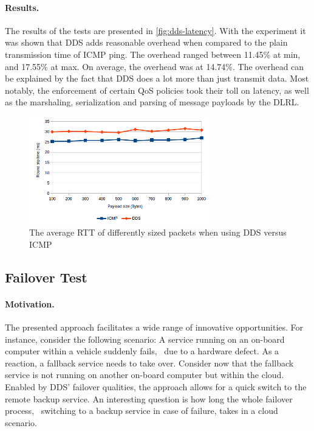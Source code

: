 \paragraph{Results.} 
The results of the tests are presented in \autoref{fig:dds-latency}. With the experiment it was shown that DDS adds reasonable overhead when compared to the plain transmission time of ICMP ping. The overhead ranged between 11.45\% at min, and 17.55\% at max. On average, the overhead was at 14.74\%. The overhead can be explained by the fact that DDS does a lot more than just transmit data. Most notably, the enforcement of certain QoS policies took their toll on latency, as well as the marshaling, serialization and parsing of message payloads by the DLRL.


\begin{figure}[htpb]
  \centering
  \includegraphics[width=0.7\textwidth]{figures/dds-latency}
  \caption[DDS latency benchmark results]{The average RTT of differently sized packets when using DDS versus ICMP}\label{fig:dds-latency}
\end{figure}

%
%
%
%
%
%
%
%
%
%


\subsection{Failover Test}\label{sec:failovertest}

\paragraph{Motivation.} The presented approach facilitates a wide range of innovative opportunities. For instance, consider the following scenario: A service running on an on-board computer within a vehicle suddenly fails, \eg\ due to a hardware defect. As a reaction, a fallback service needs to take over. Consider now that the fallback service is not running on another on-board computer but within the cloud. Enabled by DDS' failover qualities, the approach allows for a quick switch to the remote backup service. An interesting question is how long the whole failover process, \ie\ switching to a backup service in case of failure, takes in a cloud scenario.



